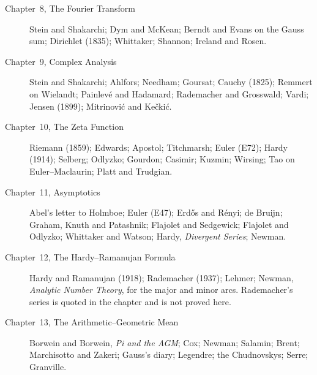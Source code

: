 \begin{description}
\item[Chapter~8, The Fourier Transform] Stein and Shakarchi; Dym and McKean; Berndt and Evans on the Gauss sum; Dirichlet (1835); Whittaker; Shannon; Ireland and Rosen.
\item[Chapter~9, Complex Analysis] Stein and Shakarchi; Ahlfors; Needham; Goursat; Cauchy (1825); Remmert on Wielandt; Painlev\'e and Hadamard; Rademacher and Grosswald; Vardi; Jensen (1899); Mitrinovi\'c and Ke\v cki\'c.
\item[Chapter~10, The Zeta Function] Riemann (1859); Edwards; Apostol; Titchmarsh; Euler (E72); Hardy (1914); Selberg; Odlyzko; Gourdon; Casimir; Kuzmin; Wirsing; Tao on Euler--Maclaurin; Platt and Trudgian.
\item[Chapter~11, Asymptotics] Abel's letter to Holmboe; Euler (E47); Erd\H os and R\'enyi; de Bruijn; Graham, Knuth and Patashnik; Flajolet and Sedgewick; Flajolet and Odlyzko; Whittaker and Watson; Hardy, \emph{Divergent Series}; Newman.
\item[Chapter~12, The Hardy--Ramanujan Formula] Hardy and Ramanujan (1918); Rademacher (1937); Lehmer; Newman, \emph{Analytic Number Theory}, for the major and minor arcs. Rademacher's series is quoted in the chapter and is not proved here.
\item[Chapter~13, The Arithmetic--Geometric Mean] Borwein and Borwein, \emph{Pi and the AGM}; Cox; Newman; Salamin; Brent; Marchisotto and Zakeri; Gauss's diary; Legendre; the Chudnovskys; Serre; Granville.
\end{description}
